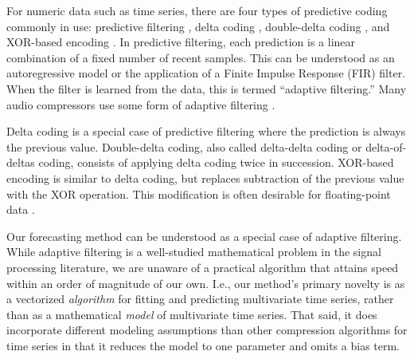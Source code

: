 For numeric data such as time series, there are four types of predictive coding commonly in use: predictive filtering \cite{png}, delta coding \cite{fastpfor, bbp}, double-delta coding \cite{influxDB, gorilla}, and XOR-based encoding \cite{gorilla}. In predictive filtering, each prediction is a linear combination of a fixed number of recent samples. This can be understood as an autoregressive model or the application of a Finite Impulse Response (FIR) filter. When the filter is learned from the data, this is termed ``adaptive filtering.'' Many audio compressors use some form of adaptive filtering \cite{shorten, flac, aac}.

Delta coding is a special case of predictive filtering where the prediction is always the previous value. Double-delta coding, also called delta-delta coding or delta-of-deltas coding, consists of applying delta coding twice in succession. XOR-based encoding is similar to delta coding, but replaces subtraction of the previous value with the XOR operation. This modification is often desirable for floating-point data \cite{gorilla}.

Our forecasting method can be understood as a special case of adaptive filtering. While adaptive filtering is a well-studied mathematical problem in the signal processing literature, we are unaware of a practical algorithm that attains speed within an order of magnitude of our own. I.e., our method's primary novelty is as a vectorized \textit{algorithm} for fitting and predicting multivariate time series, rather than as a mathematical \textit{model} of multivariate time series. That said, it does incorporate different modeling assumptions than other compression algorithms for time series in that it reduces the model to one parameter and omits a bias term. %




